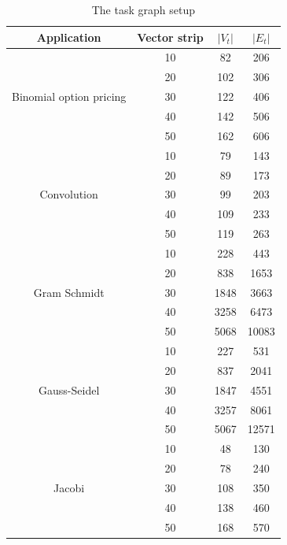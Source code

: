 \begin{table}[h!]
  \centering
  \begin{tabular}{|c|c|c|c|}
    \hline
    \textbf{Application} & \textbf{Vector strip} & $|V_t|$ & $|E_t|$ \\
    \hline
    \multirow{5}{*}{Binomial option pricing} & 10 & 82 & 206 \\
    & 20 & 102 & 306 \\
    & 30 & 122 & 406 \\
    & 40 & 142 & 506 \\
    & 50 & 162 & 606 \\
    \hline
    \multirow{5}{*}{Convolution} & 10 & 79 & 143 \\
    & 20 & 89 & 173 \\
    & 30 & 99 & 203 \\
    & 40 & 109 & 233 \\
    & 50 & 119 & 263 \\
    \hline
    \multirow{5}{*}{Gram Schmidt} & 10 & 228 & 443 \\
    & 20 & 838 & 1653 \\
    & 30 & 1848 & 3663 \\
    & 40 & 3258 & 6473 \\
    & 50 & 5068 & 10083\\
    \hline
    \multirow{5}{*}{Gauss-Seidel} & 10 & 227 & 531 \\
    & 20 & 837 & 2041 \\
    & 30 & 1847 & 4551 \\
    & 40 & 3257 & 8061 \\
    & 50 & 5067 & 12571\\
    \hline
    \multirow{5}{*}{Jacobi} & 10 & 48 & 130 \\
    & 20 & 78 & 240 \\
    & 30 & 108 & 350 \\
    & 40 & 138 & 460 \\
    & 50 & 168 & 570\\
    \hline
  \end{tabular}
  \caption{The task graph setup}
  \label{tab:1}
\end{table}


